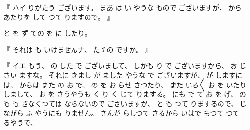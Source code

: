 %
『
ハイ
りがたう
ございます。
%
まあ
は
い
やうな
もので
ございますが、
%
から
あたりを
して
つて
りますので。
』

%
と
を
ず
ての
を
に
したり。

%
『
それは
も
いけませんナ、
%
たゞの%
ですか。
』

%
『
イエ
もう、
%
の
した
で
ございまして、
%
しかも
り
で
ございますから、
%
お
じ
さい
ますな。
%
それに
きまし
が%
ました
やうな
で
ございますが、
%
が%
しますには、
%
からは
また
の
お
で、
%
の
を
お
らせ
さつたり、
%
また
いろ〳〵
お
を
いたり%
しまして、
%
お
を
%
さうやうも
く
り
く
じて
りまする。
%
にも
で
て
お
を
げ、
%
の
も
も
さなくつては
ならないので
ございますが、
%
と%
も
つて
りまするので、
%
じながら
ふ
やうにも
りません。
%
さんが
らしつて
さるから
いはで
もつて
つて
るやうで、
